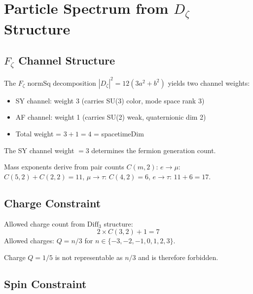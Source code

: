 \chapter{Particle Spectrum from \texorpdfstring{$D_\zeta$}{Dζ} Structure}
\label{chap:pd_particle}

\section{\texorpdfstring{$F_\zeta$}{Fζ} Channel Structure}
\label{sec:particle_channel_structure}

The $F_\zeta$ normSq decomposition $|D_\zeta|^2 = 12(3a^2 + b^2)$ yields two channel weights:
\begin{itemize}
\item SY channel: weight 3 (carries SU(3) color, mode space rank 3)
\item AF channel: weight 1 (carries SU(2) weak, quaternionic dim 2)
\item Total weight = $3 + 1 = 4$ = spacetimeDim
\end{itemize}

The SY channel weight $= 3$ determines the fermion generation count.

Mass exponents derive from pair counts $C(m,2)$:
$e \to \mu$: $C(5,2)+C(2,2) = 11$, \quad $\mu \to \tau$: $C(4,2) = 6$, \quad $e \to \tau$: $11+6 = 17$.

\section{Charge Constraint}
\label{sec:particle_charges}

\begin{theorem}
\label{thm:particle_allowed_charges}
\leanok
Allowed charge count from $\mathrm{Diff}_3$ structure:
\[
2 \times C(3,2) + 1 = 7
\]
Allowed charges: $Q = n/3$ for $n \in \{-3, -2, -1, 0, 1, 2, 3\}$.
\end{theorem}

\begin{theorem}
\label{thm:particle_exotic_forbidden}
\leanok
Charge $Q = 1/5$ is not representable as $n/3$ and is therefore forbidden.
\end{theorem}

\section{Spin Constraint}
\label{sec:particle_spins}

